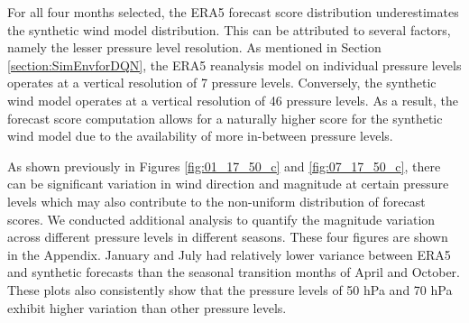 For all four months selected, the ERA5 forecast score distribution underestimates the synthetic wind model distribution. This can be attributed to several factors, namely the lesser pressure level resolution. As mentioned in Section \ref{section:SimEnvforDQN}, the ERA5 reanalysis model on individual pressure levels operates at a vertical resolution of 7 pressure levels. Conversely, the synthetic wind model operates at a vertical resolution of 46 pressure levels. As a result, the forecast score computation allows for a naturally higher score for the synthetic wind model due to the availability of more in-between pressure levels. 


As shown previously in Figures \ref{fig:01_17_50_c} and \ref{fig:07_17_50_c}, there can be significant variation in wind direction and magnitude at certain pressure levels which may also contribute to the non-uniform distribution of forecast scores. We conducted additional analysis to quantify the magnitude variation across different pressure levels in different seasons. These four figures are shown in the Appendix. 
January and July had relatively lower variance between ERA5 and synthetic forecasts than the seasonal transition months of April and October.
 These plots also consistently show that the pressure levels of 50 hPa and 70 hPa exhibit higher variation than other pressure levels.
 
 

 

